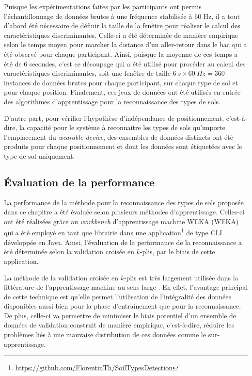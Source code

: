 Puisque les expérimentations faites par les participants ont permis l'échantillonnage de données brutes à une fréquence stabilisée à 60 Hz, il a tout d'abord été nécessaire de définir la taille de la fenêtre pour réaliser le calcul des caractéristiques discriminantes. Celle-ci a été déterminée de manière empirique selon le temps moyen pour marcher la distance d'un aller-retour dans le bac qui a été observé pour chaque participant. Ainsi, puisque la moyenne de ces temps a été de 6 secondes, c'est ce découpage qui a été utilisé pour procéder au calcul des caractéristiques discriminantes, soit une fenêtre de taille $6\:s \times 60\:Hz = 360$ instances de données brutes pour chaque participant, sur chaque type de sol et pour chaque position. Finalement, ces jeux de données ont été utilisés en entrée des algorithmes d'apprentissage pour la reconnaissance des types de sols.

D'autre part, pour vérifier l'hypothèse d'indépendance de positionnement, c'est-à-dire, la capacité pour le système à reconnaitre les types de sols qu'importe l'emplacement du \textit{wearable device}, des ensembles de données distincts ont été produits pour chaque positionnement et dont les données sont étiquetées avec le type de sol uniquement.

\subsection{Évaluation de la performance}

La performance de la méthode pour la reconnaissance des types de sols proposée dans ce chapitre a été évaluée selon plusieurs méthodes d'apprentissage. Celles-ci ont été réalisées grâce au \textit{workbench} d'apprentissage machine \acs{WEKA} (\acl{WEKA}) \citep{Holmes1994} qui a été employé en tant que librairie dans une application\footnote{\url{https://github.com/FlorentinTh/SoilTypesDetection}} de type \ac{CLI} développée en Java. Ainsi, l'évaluation de la performance de la reconnaissance a été déterminée selon la validation croisée en $k$-plis, par le biais de cette application.

La méthode de la validation croisée en $k$-plis est très largement utilisée dans la littérature de l'apprentissage machine au sens large \citep{Vail2004, Arlot2010, Kertesz2016}. En effet, l'avantage principal de cette technique est qu'elle permet l'utilisation de l'intégralité des données disponibles aussi bien pour la phase d'entraînement que pour la reconnaissance. De plus, celle-ci va permettre de minimiser le biais potentiel d'un ensemble de données de validation construit de manière empirique, c'est-à-dire, réduire les problèmes liés à une mauvaise distribution de ces données comme le sur-apprentissage.

